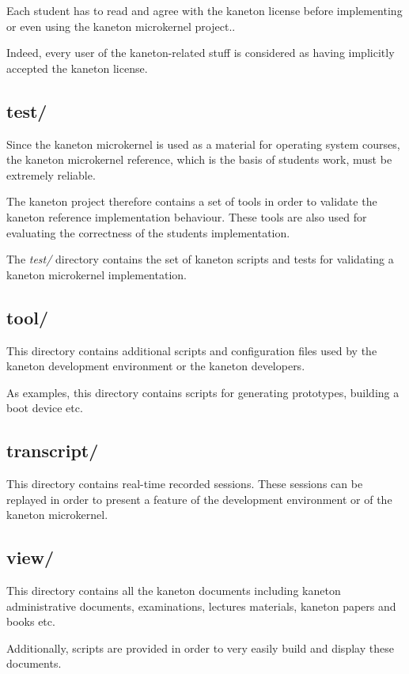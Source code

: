 Each student has to read and agree with the kaneton license before
implementing or even using the kaneton microkernel project..

Indeed, every user of the kaneton-related stuff is considered as having
implicitly accepted the kaneton license.

%
%

\subsection*{test/}

Since the kaneton microkernel is used as a material for operating system
courses, the kaneton microkernel reference, which is the basis of students
work, must be extremely reliable.

The kaneton project therefore contains a set of tools in order to validate
the kaneton reference implementation behaviour. These tools are also used
for evaluating the correctness of the students implementation.

The \textit{test/} directory contains the set of kaneton scripts and tests
for validating a kaneton microkernel implementation.

%
%

\subsection*{tool/}

This directory contains additional scripts and configuration files used by
the kaneton development environment or the kaneton developers.

As examples, this directory contains scripts for generating prototypes,
building a boot device etc.

%
%

\subsection*{transcript/}

This directory contains real-time recorded sessions. These sessions can be
replayed in order to present a feature of the development environment or
of the kaneton microkernel.

%
%

\subsection*{view/}

This directory contains all the kaneton documents including kaneton
administrative documents, examinations, lectures materials, kaneton papers
and books etc.

Additionally, scripts are provided in order to very easily build and
display these documents.